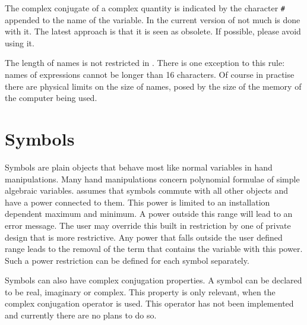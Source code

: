 The complex conjugate of a complex 
quantity is indicated by the character \verb:#: appended to the name of the 
variable. In the current version of {\FORM} not much is done with it. The 
latest approach is that it is seen as obsolete. If possible, please avoid 
using it.

The length of names is not restricted in {\FORM}. There 
is one exception to this rule: names of expressions cannot be longer than 
16 characters. Of course in practise there are physical limits on the size 
of names, posed by the size of the memory of the computer being used.

\section{Symbols}

\label{sect-symbols}
Symbols are plain objects that behave most like normal 
variables in hand manipulations. Many hand manipulations concern 
polynomial formulae of simple algebraic variables. {\FORM} assumes that 
symbols commute with all other objects and have a power connected to 
them. This power is limited to an installation dependent maximum and 
minimum. A power outside this range will lead to an error message. The 
user may override this built in restriction by one of private design that
is more restrictive. Any power that falls outside the user defined range 
leads to the removal of the term that contains the variable with this 
power. Such a power restriction can be defined for 
each symbol separately.

Symbols can also have complex conjugation 
properties. A symbol can be declared to be real, imaginary or complex. This 
property is only relevant, when the complex conjugation operator is used. 
This operator has not been implemented and currently there are no plans to 
do so. 

